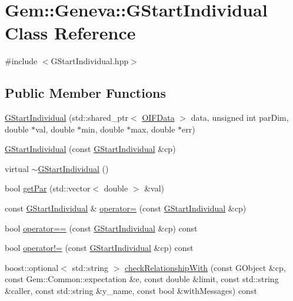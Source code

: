\hypertarget{classGem_1_1Geneva_1_1GStartIndividual}{
\section{Gem::Geneva::GStartIndividual Class Reference}
\label{dd/d14/classGem_1_1Geneva_1_1GStartIndividual}
}


{\ttfamily \#include $<$GStartIndividual.hpp$>$}

\subsection*{Public Member Functions}
\begin{DoxyCompactItemize}
\item 
\hyperlink{classGem_1_1Geneva_1_1GStartIndividual_af12cc2d6bd870fa2574ef52a3f6a5802}{GStartIndividual} (std::shared\_\-ptr$<$ \hyperlink{classOIFData}{OIFData} $>$ data, unsigned int parDim, double $\ast$val, double $\ast$min, double $\ast$max, double $\ast$err)
\item 
\hyperlink{classGem_1_1Geneva_1_1GStartIndividual_ac6e59c84c2f7aa4400234906f7f1409a}{GStartIndividual} (const \hyperlink{classGem_1_1Geneva_1_1GStartIndividual}{GStartIndividual} \&cp)
\item 
virtual \hyperlink{classGem_1_1Geneva_1_1GStartIndividual_ac39a07f9e9829da80f9eae7277ee5982}{$\sim$GStartIndividual} ()
\item 
bool \hyperlink{classGem_1_1Geneva_1_1GStartIndividual_afa74c7c218d5f06f0c5de243eaa5a350}{getPar} (std::vector$<$ double $>$ \&val)
\item 
const \hyperlink{classGem_1_1Geneva_1_1GStartIndividual}{GStartIndividual} \& \hyperlink{classGem_1_1Geneva_1_1GStartIndividual_ac490d0618fbf311eb90768fc090c63aa}{operator=} (const \hyperlink{classGem_1_1Geneva_1_1GStartIndividual}{GStartIndividual} \&cp)
\item 
bool \hyperlink{classGem_1_1Geneva_1_1GStartIndividual_a24c9a1156f06dad45afb2fc52d73ca47}{operator==} (const \hyperlink{classGem_1_1Geneva_1_1GStartIndividual}{GStartIndividual} \&cp) const 
\item 
bool \hyperlink{classGem_1_1Geneva_1_1GStartIndividual_abf9e54ba75293a2cf4d9cc8ca7716f63}{operator!=} (const \hyperlink{classGem_1_1Geneva_1_1GStartIndividual}{GStartIndividual} \&cp) const 
\item 
boost::optional$<$ std::string $>$ \hyperlink{classGem_1_1Geneva_1_1GStartIndividual_af821f39180d83fcb61b7cd49a2679a4f}{checkRelationshipWith} (const GObject \&cp, const Gem::Common::expectation \&e, const double \&limit, const std::string \&caller, const std::string \&y\_\-name, const bool \&withMessages) const 
\end{DoxyCompactItemize}
